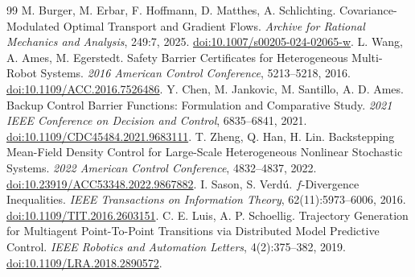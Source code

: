 \documentclass[UTF8,a4paper,11pt,fontset=none]{ctexart}
\begin{document}
\begin{thebibliography}{99}
 M. Burger, M. Erbar, F. Hoffmann, D. Matthes, A. Schlichting.
Covariance-Modulated Optimal Transport and Gradient Flows.
\emph{Archive for Rational Mechanics and Analysis}, 249:7, 2025.
\href{https://doi.org/10.1007/s00205-024-02065-w}{doi:10.1007/s00205-024-02065-w}.
 L. Wang, A. Ames, M. Egerstedt.
Safety Barrier Certificates for Heterogeneous Multi-Robot Systems.
\emph{2016 American Control Conference}, 5213--5218, 2016.
\href{https://doi.org/10.1109/ACC.2016.7526486}{doi:10.1109/ACC.2016.7526486}.
 Y. Chen, M. Jankovic, M. Santillo, A. D. Ames.
Backup Control Barrier Functions: Formulation and Comparative Study.
\emph{2021 IEEE Conference on Decision and Control}, 6835--6841, 2021.
\href{https://doi.org/10.1109/CDC45484.2021.9683111}{doi:10.1109/CDC45484.2021.9683111}.
 T. Zheng, Q. Han, H. Lin.
Backstepping Mean-Field Density Control for Large-Scale Heterogeneous Nonlinear Stochastic Systems.
\emph{2022 American Control Conference}, 4832--4837, 2022.
\href{https://doi.org/10.23919/ACC53348.2022.9867882}{doi:10.23919/ACC53348.2022.9867882}.
 I. Sason, S. Verd\'u.
$f$-Divergence Inequalities.
\emph{IEEE Transactions on Information Theory}, 62(11):5973--6006, 2016.
\href{https://doi.org/10.1109/TIT.2016.2603151}{doi:10.1109/TIT.2016.2603151}.
 C. E. Luis, A. P. Schoellig.
Trajectory Generation for Multiagent Point-To-Point Transitions via Distributed Model Predictive Control.
\emph{IEEE Robotics and Automation Letters}, 4(2):375--382, 2019.
\href{https://doi.org/10.1109/LRA.2018.2890572}{doi:10.1109/LRA.2018.2890572}.
\end{thebibliography}
\end{document}
